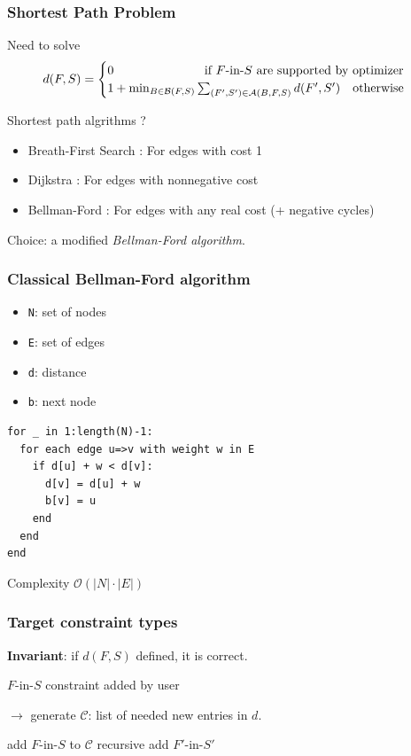 \documentclass{beamer}
\begin{document}
\begin{frame}
  \frametitle{Shortest Path Problem}
  Need to solve
  \[
    d(F, S)
    =
    \begin{cases}
    0 \qquad \qquad \quad \qquad \textnormal{ if } F\textnormal{-in-}S \textnormal{ are supported by optimizer}\\
    1 + \min_{B \in \mathcal{B}(F, S)} \sum_{(F', S') \in \mathcal{A}(B, F, S)} d(F', S') \quad \textnormal{otherwise}
    \end{cases}
  \]

  Shortest path algrithms ?
  \begin{itemize}
    \item Breath-First Search : For edges with cost 1
    \item Dijkstra : For edges with nonnegative cost
    \item Bellman-Ford : For edges with any real cost (+ negative cycles)
  \end{itemize}

  Choice: a modified \emph{Bellman-Ford algorithm}.
\end{frame}

\begin{frame}[fragile]
  \frametitle{Classical Bellman-Ford algorithm}
  \begin{itemize}
    \item \texttt{N}: set of nodes
    \item \texttt{E}: set of edges
    \item \texttt{d}: distance
    \item \texttt{b}: next node
  \end{itemize}
\begin{verbatim}
for _ in 1:length(N)-1:
  for each edge u=>v with weight w in E
    if d[u] + w < d[v]:
      d[v] = d[u] + w
      b[v] = u
    end
  end
end
\end{verbatim}
Complexity $\mathcal{O}(|N| \cdot |E|)$
\end{frame}

\begin{frame}
  \frametitle{Target constraint types}
  \textbf{Invariant}: if $d(F, S)$ defined, it is correct.

  $F$-in-$S$ constraint added by user

  $\to$ generate $\mathcal{C}$: list of needed new entries in $d$.
  \begin{algorithm}[H]
    \caption{recursive add $F$-in-$S$}
    \begin{algorithmic}
      \STATE add $F$-in-$S$ to $\mathcal{C}$
            \STATE recursive add $F'$-in-$S'$
          \ENDIF
        \ENDFOR
      \ENDFOR
    \end{algorithmic}
  \end{algorithm}
\end{frame}
\end{document}
